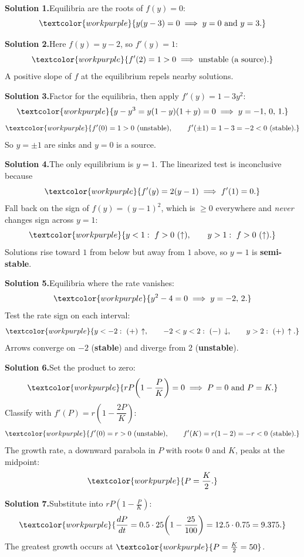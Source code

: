 \noindent\textbf{Solution 1.}\quad Equilibria are the roots of $f(y)=0$:
\[ \textcolor{workpurple}{y(y-3) = 0 \;\Longrightarrow\; y = 0 \text{ and } y = 3.} \]

\medskip
\noindent\textbf{Solution 2.}\quad Here $f(y) = y - 2$, so $f'(y) = 1$:
\[ \textcolor{workpurple}{f'(2) = 1 > 0 \;\Longrightarrow\; \text{unstable (a source).}} \]
A positive slope of $f$ at the equilibrium repels nearby solutions.

\medskip
\noindent\textbf{Solution 3.}\quad Factor for the equilibria, then apply
$f'(y) = 1 - 3y^{2}$:
\[ \textcolor{workpurple}{y - y^{3} = y(1-y)(1+y) = 0 \;\Longrightarrow\; y = -1,\,0,\,1.} \]
\[ \textcolor{workpurple}{f'(0) = 1 > 0\ (\text{unstable}), \qquad f'(\pm 1) = 1 - 3 = -2 < 0\ (\text{stable}).} \]
So $y = \pm 1$ are sinks and $y = 0$ is a source.

\medskip
\noindent\textbf{Solution 4.}\quad The only equilibrium is $y = 1$. The
linearized test is inconclusive because
\[ \textcolor{workpurple}{f'(y) = 2(y-1) \;\Longrightarrow\; f'(1) = 0.} \]
Fall back on the sign of $f(y) = (y-1)^{2}$, which is $\ge 0$ everywhere and
\emph{never} changes sign across $y = 1$:
\[ \textcolor{workpurple}{y<1:\ f>0\ (\uparrow), \qquad y>1:\ f>0\ (\uparrow).} \]
Solutions rise toward $1$ from below but away from $1$ above, so $y = 1$ is
\textbf{semi-stable}.

\medskip
\noindent\textbf{Solution 5.}\quad Equilibria where the rate vanishes:
\[ \textcolor{workpurple}{y^{2} - 4 = 0 \;\Longrightarrow\; y = -2,\,2.} \]
Test the rate sign on each interval:
\[ \textcolor{workpurple}{y<-2:\ (+)\,\uparrow, \qquad -2<y<2:\ (-)\,\downarrow, \qquad y>2:\ (+)\,\uparrow.} \]
Arrows converge on $-2$ (\textbf{stable}) and diverge from $2$
(\textbf{unstable}).

\medskip
\noindent\textbf{Solution 6.}\quad Set the product to zero:
\[ \textcolor{workpurple}{rP\!\left(1-\frac{P}{K}\right) = 0 \;\Longrightarrow\; P = 0 \text{ and } P = K.} \]
Classify with $f'(P) = r\!\left(1 - \dfrac{2P}{K}\right)$:
\[ \textcolor{workpurple}{f'(0) = r > 0\ (\text{unstable}), \qquad f'(K) = r(1-2) = -r < 0\ (\text{stable}).} \]
The growth rate, a downward parabola in $P$ with roots $0$ and $K$, peaks at the
midpoint:
\[ \textcolor{workpurple}{P = \frac{K}{2}.} \]

\medskip
\noindent\textbf{Solution 7.}\quad Substitute into $rP\!\left(1-\frac{P}{K}\right)$:
\[ \textcolor{workpurple}{\frac{dP}{dt} = 0.5 \cdot 25\!\left(1 - \frac{25}{100}\right) = 12.5 \cdot 0.75 = 9.375.} \]
The greatest growth occurs at
$\textcolor{workpurple}{P = \frac{K}{2} = 50}$.

